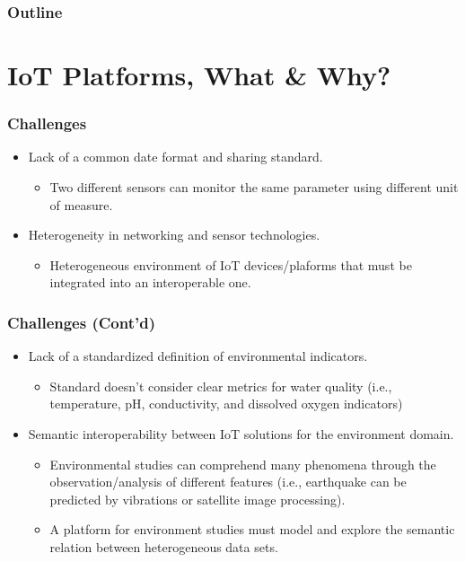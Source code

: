 \documentclass{../iot-lecture}
\subtitle{IoT Platforms}
\begin{document}
\begin{frame}
  \titlepage{}
\end{frame}
\begin{frame}
  \frametitle{Outline}
  \tableofcontents{}
\end{frame}

\section{IoT Platforms, What \& Why?}

\begin{frame}
  \frametitle{Challenges}
  \begin{itemize}
    \item Lack of a common date format and sharing standard.
    \begin{itemize}
      \item Two different sensors can monitor the same parameter using different unit of measure.
    \end{itemize}
    \item Heterogeneity in networking and sensor technologies.
    \begin{itemize}
      \item Heterogeneous environment of IoT devices/plaforms that must be integrated into an interoperable one.
    \end{itemize}
  \end{itemize}
\end{frame}

\begin{frame}
  \frametitle{Challenges (Cont'd)}
  \begin{itemize}
    \item Lack of a standardized definition of environmental indicators.
    \begin{itemize}
      \item Standard doesn't consider clear metrics for water quality (i.e., temperature, pH, conductivity, and dissolved oxygen indicators)
    \end{itemize}
    \item Semantic interoperability between IoT solutions for the environment domain.
    \begin{itemize}
      \item Environmental studies can comprehend many phenomena through the observation/analysis of different features
        (i.e., earthquake can be predicted by vibrations or satellite image processing).
      \item A platform for environment studies must model and explore the semantic relation between heterogeneous data sets.
    \end{itemize}
  \end{itemize}
\end{frame}
\end{document}
